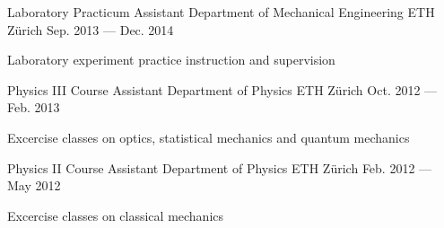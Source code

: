 \begin{cventries}
  \cventry
    {Laboratory Practicum Assistant} %
    {Department of Mechanical Engineering} %
    {ETH Z{\"u}rich} %
    {Sep. 2013 --- Dec. 2014} %
    {
      \begin{cvitems} %
        \item {Laboratory experiment practice instruction and supervision}
      \end{cvitems}
    }

  \cventry
    {Physics III Course Assistant} %
    {Department of Physics} %
    {ETH Z{\"u}rich} %
    {Oct. 2012 --- Feb. 2013} %
    {
      \begin{cvitems} %
        \item {Excercise classes on optics, statistical mechanics and quantum mechanics}
      \end{cvitems}
    }

  \cventry
    {Physics II Course Assistant} %
    {Department of Physics} %
    {ETH Z{\"u}rich} %
    {Feb. 2012 --- May 2012} %
    {
      \begin{cvitems} %
        \item {Excercise classes on classical mechanics}
      \end{cvitems}
    }

\end{cventries}
